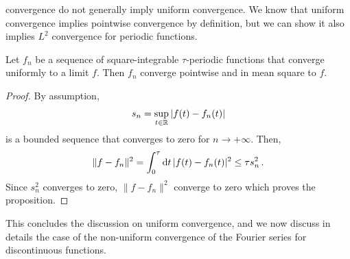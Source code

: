 convergence do not generally imply uniform convergence. We know that uniform convergence
implies pointwise convergence by definition, but we can show it also implies $L^2$
convergence for periodic functions.
\begin{proposition}
	\label{prop:uniconv-l2conv}
	Let $f_n$ be a sequence of square-integrable $\tau$-periodic functions that converge
	uniformly to a limit $f$. Then $f_n$ converge pointwise and in mean square to $f$.
\end{proposition}
\begin{proof}
	By assumption,
	\begin{equation}
		s_n=\sup_{t\in\mathbb{R}}|f(t)-f_n(t)|
	\end{equation}
	is a bounded sequence that converges to zero for $n\to+\infty$. Then,
	\begin{equation}
		\|f-f_n\|^2=\int_{0}^{\tau}\mathrm{d} t\,|f(t)-f_n(t)|^2\leq \tau s_n^2\,.
	\end{equation}
	Since $s_n^2$ converges to zero, $\|f-f_n\|^2$ converge to zero which proves the
	proposition.
\end{proof}

This concludes the discussion on uniform convergence, and we now discuss in details the
case of the non-uniform convergence of the Fourier series for discontinuous functions.
